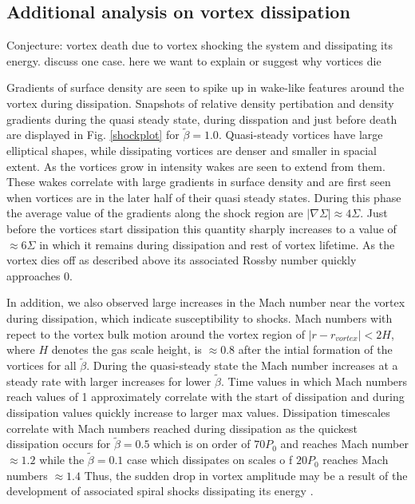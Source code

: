 {\bf
\subsection{Additional analysis on vortex dissipation}
Conjecture: vortex death due to vortex shocking the system and
dissipating its energy. discuss one case. here we want to explain or
suggest why vortices die} 

Gradients of surface density are seen to
spike up in wake-like features around the vortex during dissipation. 
Snapshots of relative density pertibation and density gradients during the
quasi steady state, during disspation and just before death are displayed in
Fig. \ref{shockplot} for $\tilde\beta=1.0$. Quasi-steady vortices have large 
elliptical shapes, while dissipating vortices are denser and smaller in spacial
extent.
As the vortices grow in intensity wakes are seen to extend from them. These
wakes correlate with large gradients in surface density and are first seen
when vortices are in the later half of their quasi steady states. During this
phase the average value of the gradients along the shock region are
$|\nabla\Sigma| \approx 4 \Sigma$. Just before the vortices start dissipation
this quantity sharply increases to a value of $ \approx6 \Sigma$ in which it
 remains during dissipation and rest of vortex lifetime.  
As the vortex dies off as described above its associated Rossby number quickly
approaches $0$.


In addition, we also observed large increases in the Mach number near
the vortex during dissipation, which indicate susceptibility to
shocks. Mach numbers with repect to the vortex bulk motion around the vortex
 region of $|r-r_{vortex}|<2H$, where $H$ denotes the gas scale height, is
 $\approx 0.8$ after the intial formation of the vortices for all
 $\tilde\beta$. During the quasi-steady state the Mach number increases at a
 steady rate with larger increases for lower $\tilde\beta$. Time values in
 which Mach numbers reach values of 1 approximately correlate with the start 
of dissipation and during dissipation values quickly increase to larger max values.
 Dissipation timescales correlate with 
Mach numbers reached during dissipation as the quickest dissipation occurs for 
$\tilde\beta=0.5$ which is on order of $70P_0$ and reaches Mach number
 $\approx1.2$ while the $\tilde\beta=0.1$ case which dissipates on scales o
f $20P_0$ reaches Mach numbers $\approx1.4$
Thus, the sudden drop in vortex amplitude may  
be a result of the development of associated spiral shocks dissipating
its energy \citep[cf.][who 
  suggested damping due to planet-induced shocks]{fu14}.  

